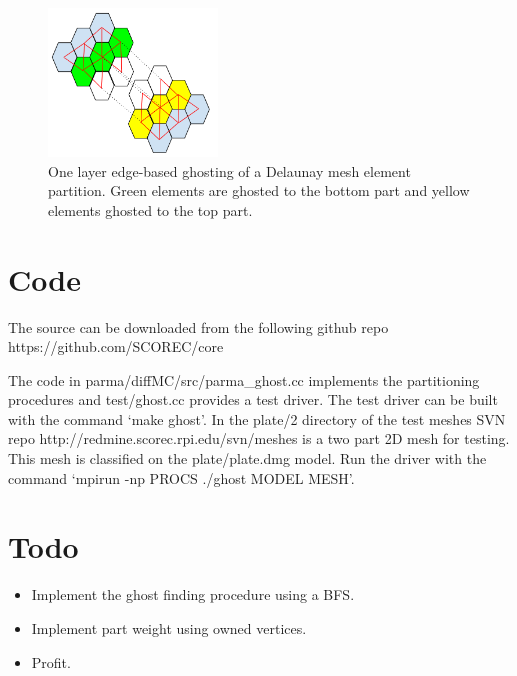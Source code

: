 \documentclass[a4paper]{article}
\begin{document}
\begin{figure} 
\centering
\includegraphics[width=0.4\textwidth]{ghostingOwnershipFig4.png}
\caption{\label{fig:ownership4} One layer edge-based ghosting of a Delaunay mesh element partition.  Green elements are ghosted to the bottom part and yellow elements ghosted to the top part.}
\end{figure}

\section{Code}

The source can be downloaded from the following github repo \\
https://github.com/SCOREC/core

The code in parma/diffMC/src/parma\_ghost.cc implements the partitioning procedures and test/ghost.cc provides a test driver.  The test driver can be built with the command `make ghost'.  In the plate/2 directory of the test meshes SVN repo http://redmine.scorec.rpi.edu/svn/meshes is a two part 2D mesh for testing.  This mesh is classified on the plate/plate.dmg model.  Run the driver with the command `mpirun -np PROCS ./ghost MODEL MESH'.

\section{Todo}

\begin{itemize}
\item Implement the ghost finding procedure using a BFS.
\item Implement part weight using owned vertices.
\item Profit.
\end{itemize}
\end{document}
